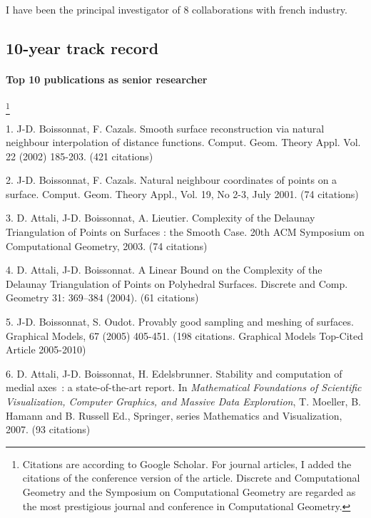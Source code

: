 I have been the principal investigator of 8 collaborations with french industry.

\newpage

\subsection{10-year track record}

\paragraph{Top 10 publications as senior researcher}\footnote{Citations are according to Google Scholar. For journal articles, I added the citations of the conference version of the article. Discrete and Computational Geometry and the Symposium on Computational Geometry are regarded as the most prestigious journal and conference in Computational Geometry.}  \mbox{}


1. J-D. Boissonnat, F. Cazals. Smooth surface reconstruction via natural neighbour interpolation of
distance functions.  Comput. Geom. Theory Appl. Vol. 22 (2002) 185-203.  (421 citations)

2.  J-D. Boissonnat, F. Cazals. Natural neighbour coordinates of points on a surface.  
Comput. Geom. Theory Appl., Vol. 19, No 2-3, July 2001. (74 citations)

3. D. Attali, J-D. Boissonnat, A. Lieutier. Complexity of the Delaunay Triangulation of Points on Surfaces : the 
Smooth Case. 20th  ACM      Symposium on Computational Geometry, 2003. 
(74 citations)

4. D. Attali, J-D. Boissonnat. A Linear Bound on the Complexity of the Delaunay Triangulation of Points on Polyhedral Surfaces.  Discrete and Comp. Geometry 31: 369--384
(2004). (61 citations)

5. J-D. Boissonnat, S. Oudot. Provably good sampling and meshing of surfaces. Graphical Models, 67 (2005) 405-451. (198 citations. Graphical Models Top-Cited Article 2005-2010)

6. D. Attali, J-D. Boissonnat, H. Edelsbrunner. Stability and computation of medial axes~: a state-of-the-art report.
In {\em Mathematical Foundations of Scientific Visualization,
Computer Graphics, and Massive Data Exploration},
T. Moeller,   B. Hamann and B. Russell Ed.,
Springer, series Mathematics and Visualization, 2007. (93 citations)

